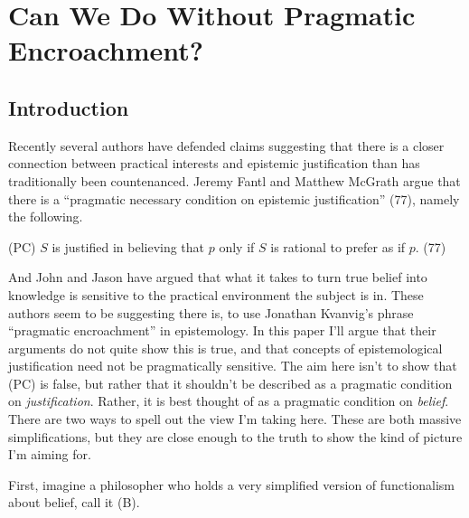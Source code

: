 %
%
%
%
%
%
%
%
%
%
\chapter{Can We Do Without Pragmatic Encroachment?}


\section{Introduction}

Recently several authors have defended claims suggesting that there is a closer connection between practical interests and epistemic justification than has traditionally been countenanced. Jeremy Fantl and Matthew McGrath \citeyear{Fantl2002} argue that there is a ``pragmatic necessary condition on epistemic justification'' (77), namely the following.

\begin{description*}
\item[(PC)] \(S\) is justified in believing that \(p\) only if \(S\) is rational to prefer as if \(p\). (77)
\end{description*}

\noindent And John \cite{Hawthorne2004} and Jason \cite{Stanley2005-STAKAP} have argued that what it takes to turn true belief into knowledge is sensitive to the practical environment the subject is in. These authors seem to be suggesting there is, to use Jonathan Kvanvig's phrase ``pragmatic encroachment'' in epistemology. In this paper I'll argue that their arguments do not quite show this is true, and that concepts of epistemological justification need not be pragmatically sensitive. The aim here isn't to show that (PC) is false, but rather that it shouldn't be described as a pragmatic condition on \textit{justification}. Rather, it is best thought of as a pragmatic condition on \textit{belief}. There are two ways to spell out the view I'm taking here. These are both massive simplifications, but they are close enough to the truth to show the kind of picture I'm aiming for.

First, imagine a philosopher who holds a very simplified version of functionalism about belief, call it (B).

